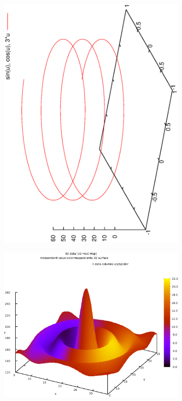\documentclass[10pt,a4paper,twocolumn,showkeys,showpacs,aps,groupedaddress,noeprint]{revtex4-1}
\begin{document}
\begin{figure}
        \begin{subfigure}[b]{0.485\textwidth}
           \centering
            \includegraphics[width=\textwidth,angle=-90]{Figs/fig1.eps}
            \label{fig:1}
\vspace{-12pt}
        \end{subfigure}
        \begin{subfigure}[b]{0.485\textwidth}
            \centering
            \includegraphics[width=\textwidth]{Figs/fig2.eps}

\end{subfigure}
\end{figure}
\end{document}
